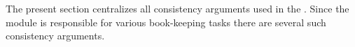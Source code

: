 The present section centralizes all consistency arguments used in the \hubMod{}.
Since the \hubMod{} module is responsible for various book-keeping tasks there are several such consistency arguments.
